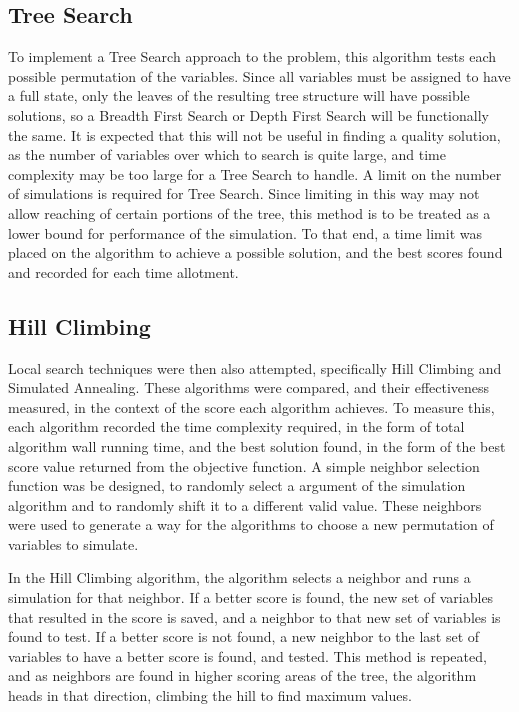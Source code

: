 \documentclass[10pt, twocolumn]{article}
\begin{document}
\subsection{Tree Search}
To implement a Tree Search approach to the problem, this algorithm tests
each possible permutation of the variables. Since all variables must be assigned
to have a full state, only the leaves of the resulting tree structure will have possible
solutions, so a Breadth First Search or Depth First Search will be functionally the same.
It is expected that this will not be useful in finding a quality solution, as the number of
variables over which to search is quite large, and time complexity may be too large for a Tree Search to handle. A limit on
the number of simulations is required for Tree Search. Since limiting in this
way may not allow reaching of certain portions of the tree, this method
is to be treated as a lower bound for performance of the simulation. To that end,
a time limit was placed on the algorithm to achieve a possible solution,
and the best scores found and recorded for each time allotment.

\subsection{Hill Climbing}
Local search techniques were then also attempted, specifically Hill Climbing and
Simulated Annealing.\cite{damouth} These algorithms were compared, and their
effectiveness measured, in the context of the score each algorithm achieves. To measure this,
each algorithm recorded the time complexity required, in the form of total
algorithm wall running time, and the best solution found, in the form of the best score value returned from the objective
function. A simple neighbor selection function was be designed, to randomly select
a argument of the simulation algorithm and to randomly shift it to a different valid value.
These neighbors were used to generate a way for the algorithms to choose a new permutation of
variables to simulate.

In the Hill Climbing algorithm, the algorithm selects a neighbor and runs a simulation for
that neighbor. If a better score is found, the new set of variables that resulted in the score
is saved, and a neighbor to that new set of variables is found to test. If a better score is not
found, a new neighbor to the last set of variables to have a better score is found, and tested. This method
is repeated, and as neighbors are found in higher scoring areas of the tree, the algorithm heads in
that direction, climbing the hill to find maximum values.
\end{document}
